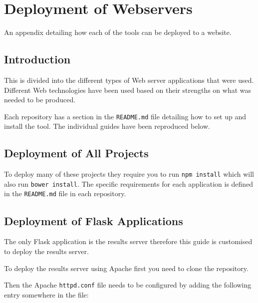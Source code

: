 \chapter{Deployment of Webservers} \label{App:Deployment of Webservers}

\begin{preamble}
An appendix detailing how each of the tools can be deployed to a website.
\end{preamble}

\section{Introduction}

This is divided into the different types of Web server applications that were used. Different Web technologies have been used based on their strengths on what was needed to be produced.

Each repository has a section in the \lstinline|README.md| file detailing how to set up and install the tool. The individual guides have been reproduced below.

\section{Deployment of All Projects}

To deploy many of these projects they require you to run \lstinline|npm install| which will also run \lstinline|bower install|. The specific requirements for each application is defined in the \lstinline|README.md| file in each repository.

\section{Deployment of Flask Applications} \label{Section:Deployment Flask Applications}

The only Flask application is the results server therefore this guide is customised to deploy the results server.

To deploy the results server using Apache first you need to clone the repository.

Then the Apache \lstinline|httpd.conf| file needs to be configured by adding the following entry somewhere in the file:

